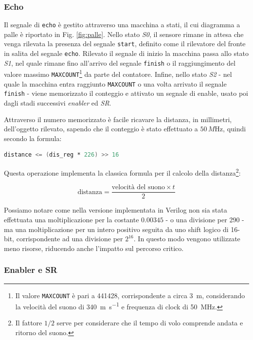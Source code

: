 \documentclass[reprint,amsmath,amssymb,aps,rmp,twoside]{revtex4-2}
\begin{document}
\subsubsection{Echo}
Il segnale di \texttt{echo} è gestito attraverso una macchina a stati, il cui diagramma a palle è  riportato in Fig. \ref{fig:palle}. Nello stato \textit{S0}, il sensore rimane in attesa che venga rilevata la presenza del segnale \texttt{start}, definito come il rilevatore del fronte in salita del segnale \texttt{echo}. Rilevato il segnale di inizio la macchina passa allo stato \textit{S1}, nel quale rimane fino all'arrivo del segnale \texttt{finish} o il raggiungimento del valore massimo \texttt{MAXCOUNT}\footnote{Il valore \texttt{MAXCOUNT} è pari a 441428, corrispondente a circa \qty{3}{\meter}, considerando la velocità del suono di \qty{340}{\meter\second^{-1}} e frequenza di clock di \qty{50}{\mega\hertz}.} da parte del contatore. Infine, nello stato \textit{S2} - nel quale la macchina entra raggiunto \texttt{MAXCOUNT} o una volta arrivato il segnale \texttt{finish} - viene memorizzato il conteggio e attivato un segnale di enable, usato poi dagli stadi successivi \textit{enabler} ed \textit{SR}.

Attraverso il numero memorizzato è facile ricavare la distanza, in millimetri, dell'oggetto rilevato, sapendo che il conteggio è stato effettuato a $50\,\si{M\hertz}$, quindi secondo la formula:

\begin{lstlisting}[language=Verilog]
distance <= (dis_reg * 226) >> 16
\end{lstlisting}

Questa operazione implementa la classica formula per il calcolo della distanza\footnote{Il fattore $1/2$ serve per considerare che il tempo di volo comprende andata e ritorno del suono.}:

\[
\text{distanza} = \frac{\text{velocità del suono} \times t}{2}
\]

Possiamo notare come nella versione implementata in Verilog non sia stata effettuata una moltiplicazione per la costante $0.00345$ - o una divisione per 290 -  ma una moltiplicazione per un intero positivo seguita da uno shift logico di 16-bit, corrispondente ad una divisione per $2^{16}$. In questo modo vengono utilizzate meno risorse, riducendo anche l'impatto sul percorso critico.

\subsubsection{Enabler e SR}
\end{document}
